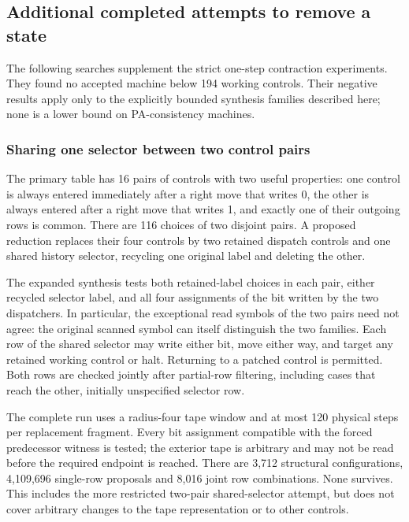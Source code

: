 \subsection{Additional completed attempts to remove a state}
\label{sec:additional-reductions}

The following searches supplement the strict one-step contraction experiments.
They found no accepted machine below 194 working controls. Their negative
results apply only to the explicitly bounded synthesis families described
here; none is a lower bound on PA-consistency machines.

\subsubsection{Sharing one selector between two control pairs}

The primary table has 16 pairs of controls with two useful properties:
one control is always entered immediately after a right move that writes 0,
the other is always entered after a right move that writes 1, and exactly
one of their outgoing rows is common. There are 116 choices of two disjoint
pairs. A proposed reduction replaces their four controls by two retained
dispatch controls and one shared history selector, recycling one original
label and deleting the other.

The expanded synthesis tests both retained-label choices in each pair,
either recycled selector label, and all four assignments of the bit written
by the two dispatchers. In particular, the exceptional read symbols of the
two pairs need not agree: the original scanned symbol can itself distinguish
the two families. Each row of the shared selector may write either bit,
move either way, and target any retained working control or halt. Returning
to a patched control is permitted. Both rows are checked jointly after
partial-row filtering, including cases that reach the other, initially
unspecified selector row.

The complete run uses a radius-four tape window and at most 120 physical
steps per replacement fragment. Every bit assignment compatible with the
forced predecessor witness is tested; the exterior tape is arbitrary and
may not be read before the required endpoint is reached. There are
3,712 structural configurations, 4,109,696 single-row proposals and 8,016
joint row combinations. None survives. This includes the more restricted
two-pair shared-selector attempt, but does not cover arbitrary changes to
the tape representation or to other controls.

